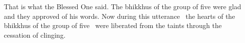 \clearpage

\begin{english-only-hang}
  That is what the Blessed One said. The bhikkhus of the group of five were glad and they approved of his words. Now during this utterance \breathmark\ the hearts of the bhikkhus of the group of five \breathmark\ were liberated from the taints through the cessation of clinging.
\end{english-only-hang}

\suttaRef{[SN 22.59]}

